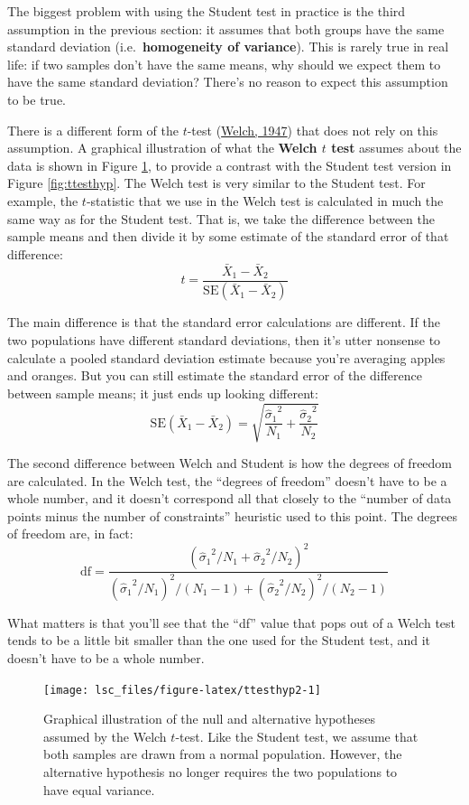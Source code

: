 \documentclass[
]{book}
\theoremstyle{definition}
\theoremstyle{definition}
\theoremstyle{definition}
\theoremstyle{definition}
\theoremstyle{remark}
\begin{document}
The biggest problem with using the Student test in practice is the third assumption in the previous section: it assumes that both groups have the same standard deviation (i.e.~\textbf{homogeneity of variance}). This is rarely true in real life: if two samples don't have the same means, why should we expect them to have the same standard deviation? There's no reason to expect this assumption to be true.

There is a different form of the \(t\)-test (\protect\hyperlink{ref-Welch1947}{Welch, 1947}) that does not rely on this assumption. A graphical illustration of what the \textbf{Welch \(t\) test} assumes about the data is shown in Figure \ref{fig:ttesthyp2}, to provide a contrast with the Student test version in Figure \ref{fig:ttesthyp}. The Welch test is very similar to the Student test. For example, the \(t\)-statistic that we use in the Welch test is calculated in much the same way as for the Student test. That is, we take the difference between the sample means and then divide it by some estimate of the standard error of that difference:
\[
t = \frac{\bar{X}_1 - \bar{X}_2}{\mbox{SE}({\bar{X}_1 - \bar{X}_2})}
\]

The main difference is that the standard error calculations are different. If the two populations have different standard deviations, then it's utter nonsense to calculate a pooled standard deviation estimate because you're averaging apples and oranges. But you can still estimate the standard error of the difference between sample means; it just ends up looking different:
\[
\mbox{SE}({\bar{X}_1 - \bar{X}_2}) = \sqrt{ \frac{{\hat{\sigma}_1}^2}{N_1} + \frac{{\hat{\sigma}_2}^2}{N_2} }
\]

The second difference between Welch and Student is how the degrees of freedom are calculated. In the Welch test, the ``degrees of freedom'' doesn't have to be a whole number, and it doesn't correspond all that closely to the ``number of data points minus the number of constraints'' heuristic used to this point. The degrees of freedom are, in fact:
\[
\mbox{df} = \frac{ ({\hat{\sigma}_1}^2 / N_1 + {\hat{\sigma}_2}^2 / N_2)^2 }{ ({\hat{\sigma}_1}^2 / N_1)^2 / (N_1 -1 ) + ({\hat{\sigma}_2}^2 / N_2)^2 / (N_2 -1 ) } 
\]

What matters is that you'll see that the ``df'' value that pops out of a Welch test tends to be a little bit smaller than the one used for the Student test, and it doesn't have to be a whole number.

\begin{figure}

{\centering \texttt{[image: lsc\_files/figure-latex/ttesthyp2-1]} 

}

\caption{Graphical illustration of the null and alternative hypotheses assumed by the Welch $t$-test. Like the Student test, we assume that both samples are drawn from a normal population. However, the alternative hypothesis no longer requires the two populations to have equal variance.}\label{fig:ttesthyp2}
\end{figure}
\end{document}
